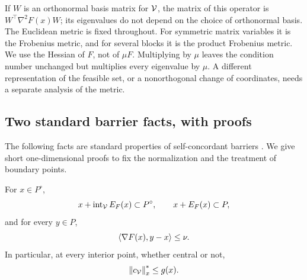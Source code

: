 If $W$ is an orthonormal basis matrix for $\mathcal V$, the matrix of this operator
is $W^\top\nabla^2F(x)W$; its eigenvalues do not depend on the choice of
orthonormal basis. The Euclidean metric is fixed throughout. For symmetric
matrix variables it is the Frobenius metric, and for several blocks it is
the product Frobenius metric. We use the Hessian of $F$, not of $\mu F$.
Multiplying by $\mu$ leaves the condition number unchanged but multiplies
every eigenvalue by $\mu$. A different representation of the feasible set,
or a nonorthogonal change of coordinates, needs a separate analysis of
the metric.

\subsection{Two standard barrier facts, with proofs}

The following facts are standard properties of self-concordant barriers
\citep{nesterov1994,renegar2001}. We give short one-dimensional proofs
to fix the normalization and the treatment of boundary points.

\begin{lemma}
\label{lem:standard-containment}
For $x\in P^\circ$,
\begin{equation}
 x+\operatorname{int}_{\mathcal V} E_F(x)\subset P^\circ,
 \qquad x+E_F(x)\subset P,
 \label{eq:dikin}
\end{equation}
and for every $y\in P$,
\begin{equation}
 \left\langle \nabla F(x),y-x\right\rangle\leq\nu.
 \label{eq:semiboundedness}
\end{equation}
In particular, at every interior point, whether central or not,
\begin{equation}
 \left\lVert c_{\mathcal V}\right\rVert_x^*\leq g(x).
 \label{eq:objective-support}
\end{equation}
\end{lemma}

